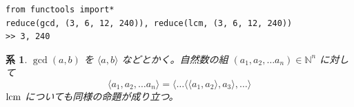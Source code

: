 \documentclass[12pt, a4j]{ltjsarticle}
\newtheorem{cor}[thm]{系}
\newcommand*{\lcm}{{\rm lcm}}
\begin{document}
\vspace{1cm}

\begin{lstlisting}
from functools import*
reduce(gcd, (3, 6, 12, 240)), reduce(lcm, (3, 6, 12, 240))
>> 3, 240
\end{lstlisting}
\begin{cor} $\gcd(a,b)$ を $\langle a,b \rangle$ などとかく。自然数の組 $(a_1,a_2,\ldots a_n)\in\mathbb{N}^n$ に対して
\begin{equation}
\langle a_1,a_2,\ldots a_n \rangle = \langle\ldots\langle\langle a_1, a_2 \rangle, a_3\rangle,\ldots\rangle
\end{equation}
$\lcm$ についても同様の命題が成り立つ。
\end{cor}

\vspace{1cm}
\end{document}

